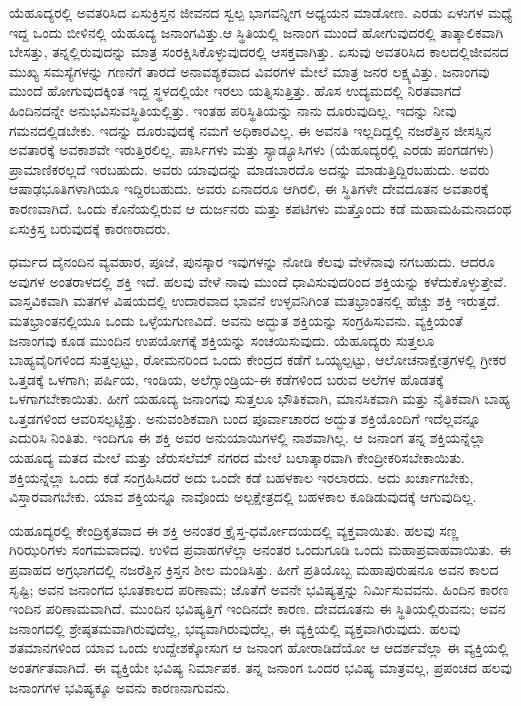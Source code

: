 ಯೆಹೂದ್ಯರಲ್ಲಿ ಅವತರಿಸಿದ ಏಸುಕ್ರಿಸ್ತನ ಜೀವನದ ಸ್ವಲ್ಪ ಭಾಗವನ್ನೀಗ ಅಧ್ಯಯನ ಮಾಡೋಣ. ಎರಡು ಏಳುಗಳ ಮಧ್ಯೆ ಇದ್ದ ಒಂದು ಬೀಳಿನಲ್ಲಿ ಯೆಹೂದ್ಯ ಜನಾಂಗವಿತ್ತು.\break ಆ ಸ್ಥಿತಿಯಲ್ಲಿ ಜನಾಂಗ ಮುಂದೆ ಹೋಗುವುದರಲ್ಲಿ ತಾತ್ಕಾಲಿಕವಾಗಿ ಬೇಸತ್ತು, ತನ್ನಲ್ಲಿರುವುದನ್ನು ಮಾತ್ರ ಸಂರಕ್ಷಿಸಿಕೊಳ್ಳುವುದರಲ್ಲಿ ಆಸಕ್ತವಾಗಿತ್ತು. ಏಸುವು ಅವತರಿಸಿದ ಕಾಲದಲ್ಲಿ\break ಜೀವನದ ಮುಖ್ಯ ಸಮಸ್ಯೆಗಳನ್ನು ಗಣನೆಗೆ ತಾರದೆ ಅನಾವಶ್ಯಕವಾದ ವಿವರಗಳ ಮೇಲೆ ಮಾತ್ರ ಜನರ ಲಕ್ಷ್ಯವಿತ್ತು. ಜನಾಂಗವು ಮುಂದೆ ಹೋಗುವುದಕ್ಕಿಂತ ಇದ್ದ ಸ್ಥಳದಲ್ಲಿಯೇ ಇರಲು ಯತ್ನಿಸುತ್ತಿತ್ತು. ಹೊಸ ಉದ್ಯಮದಲ್ಲಿ ನಿರತವಾಗದೆ ಹಿಂದಿನದನ್ನೇ ಅನುಭವಿಸುವ\break ಸ್ಥಿತಿಯಲ್ಲಿತ್ತು. ಇಂತಹ ಪರಿಸ್ಥಿತಿಯನ್ನು ನಾನು ದೂರುವುದಿಲ್ಲ. ಇದನ್ನು ನೀವು ಗಮನದಲ್ಲಿಡಬೇಕು. ಇದನ್ನು ದೂರುವುದಕ್ಕೆ ನಮಗೆ ಅಧಿಕಾರವಿಲ್ಲ. ಈ ಅವನತಿ ಇಲ್ಲದಿದ್ದಲ್ಲಿ ನಜರೆತ್ತಿನ ಜೀಸಸ್ಸಿನ ಅವತಾರಕ್ಕೆ ಅವಕಾಶವೇ ಇರುತ್ತಿರಲಿಲ್ಲ. ಪಾರ್ಸಿಗಳು ಮತ್ತು ಸ್ಯಾಡ್ಯೂಸಿಗಳು (ಯೆಹೂದ್ಯರಲ್ಲಿ ಎರಡು ಪಂಗಡಗಳು) ಪ್ರಾಮಾಣಿಕರಲ್ಲದೆ ಇರಬಹುದು. ಅವರು ಯಾವುದನ್ನು ಮಾಡಬಾರದೊ ಅದನ್ನು ಮಾಡುತ್ತಿದ್ದಿರಬಹುದು. ಅವರು ಆಷಾಢಭೂತಿಗಳಾಗಿಯೂ ಇದ್ದಿರಬಹುದು. ಅವರು ಏನಾದರೂ ಆಗಿರಲಿ, ಈ ಸ್ಥಿತಿಗಳೇ ದೇವದೂತನ ಅವತಾರಕ್ಕೆ ಕಾರಣವಾಗಿದೆ. ಒಂದು ಕೊನೆಯಲ್ಲಿರುವ ಆ ದುರ್ಜನರು ಮತ್ತು ಕಪಟಿಗಳು ಮತ್ತೊಂದು ಕಡೆ ಮಹಾಮಹಿಮನಾದಂಥ ಏಸುಕ್ರಿಸ್ತ ಬರುವುದಕ್ಕೆ ಕಾರಣರಾದರು.

ಧರ್ಮದ ದೈನಂದಿನ ವ್ಯವಹಾರ, ಪೂಜೆ, ಪುನಸ್ಕಾರ ಇವುಗಳನ್ನು ನೋಡಿ ಕೆಲವು ವೇಳೆ\break ನಾವು ನಗಬಹುದು. ಆದರೂ ಅವುಗಳ ಅಂತರಾಳದಲ್ಲಿ ಶಕ್ತಿ ಇದೆ. ಹಲವು ವೇಳೆ ನಾವು ಮುಂದೆ ಧಾವಿಸುವುದರಿಂದ ಶಕ್ತಿಯನ್ನು ಕಳೆದುಕೊಳ್ಳುತ್ತೇವೆ. ವಾಸ್ತವಿಕವಾಗಿ ಮತಗಳ ವಿಷಯದಲ್ಲಿ ಉದಾರವಾದ ಭಾವನೆ ಉಳ್ಳವನಿಗಿಂತ ಮತಭ್ರಾಂತನಲ್ಲಿ ಹೆಚ್ಚು ಶಕ್ತಿ ಇರುತ್ತದೆ. ಮತಭ್ರಾಂತನಲ್ಲಿಯೂ ಒಂದು ಒಳ್ಳೆಯಗುಣವಿದೆ. ಅವನು ಅದ್ಭುತ ಶಕ್ತಿಯನ್ನು ಸಂಗ್ರಹಿಸುವನು. ವ್ಯಕ್ತಿಯಂತೆ ಜನಾಂಗವು ಕೂಡ ಮುಂದಿನ ಉಪಯೋಗಕ್ಕೆ ಶಕ್ತಿಯನ್ನು ಸಂಚಯಿಸುವುದು. ಯೆಹೂದ್ಯರು ಸುತ್ತಲೂ ಬಾಹ್ಯವೈರಿಗಳಿಂದ ಸುತ್ತಲ್ಪಟ್ಟು, ರೋಮನರಿಂದ ಒಂದು ಕೇಂದ್ರದ ಕಡೆಗೆ ಒಯ್ಯಲ್ಪಟ್ಟು, ಆಲೋಚನಾಕ್ಷೇತ್ರಗಳಲ್ಲಿ ಗ್ರೀಕರ ಒತ್ತಡಕ್ಕೆ ಒಳಗಾಗಿ; ಪರ್ಷಿಯ, ಇಂಡಿಯ, ಅಲೆಗ್ಸಾಂಡ್ರಿಯ-ಈ ಕಡೆಗಳಿಂದ ಬರುವ ಅಲೆಗಳ ಹೊಡತಕ್ಕೆ ಒಳಗಾಗಬೇಕಾಯಿತು. ಹೀಗೆ ಯಹೂದ್ಯ ಜನಾಂಗವು ಸುತ್ತಲೂ ಭೌತಿಕವಾಗಿ, ಮಾನಸಿಕವಾಗಿ ಮತ್ತು ನೈತಿಕವಾಗಿ ಬಾಹ್ಯ ಒತ್ತಡಗಳಿಂದ ಆವರಿಸಲ್ಪಟ್ಟಿತ್ತು. ಅನುವಂಶಿಕವಾಗಿ ಬಂದ ಪೂರ್ವಾಚಾರದ ಅದ್ಭುತ ಶಕ್ತಿಯೊಂದಿಗೆ ಇದೆಲ್ಲವನ್ನೂ ಎದುರಿಸಿ ನಿಂತಿತು. ಇಂದಿಗೂ ಈ ಶಕ್ತಿ ಅವರ ಅನುಯಾಯಿಗಳಲ್ಲಿ ನಾಶವಾಗಿಲ್ಲ. ಆ ಜನಾಂಗ ತನ್ನ ಶಕ್ತಿಯನ್ನೆಲ್ಲಾ ಯಹೂದ್ಯ ಮತದ ಮೇಲೆ ಮತ್ತು ಜೆರುಸಲೆಮ್​ ನಗರದ ಮೇಲೆ ಬಲಾತ್ಕಾರವಾಗಿ ಕೇಂದ್ರೀಕರಿಸಬೇಕಾಯಿತು. ಶಕ್ತಿಯನ್ನೆಲ್ಲಾ ಒಂದು ಕಡೆ ಸಂಗ್ರಹಿಸಿದರೆ ಅದು ಒಂದೇ ಕಡೆ ಬಹಳಕಾಲ ಇರಲಾರದು. ಅದು ಖರ್ಚಾಗಬೇಕು, ವಿಸ್ತಾರವಾಗಬೇಕು. ಯಾವ ಶಕ್ತಿಯನ್ನೂ ನಾವೊಂದು ಅಲ್ಪಕ್ಷೇತ್ರದಲ್ಲಿ ಬಹಳಕಾಲ ಕೂಡಿಡುವುದಕ್ಕೆ ಆಗುವುದಿಲ್ಲ.

ಯಹೂದ್ಯರಲ್ಲಿ ಕೇಂದ್ರಿಕೃತವಾದ ಈ ಶಕ್ತಿ ಅನಂತರ ಕ್ರೈಸ್ತ-ಧರ್ಮೋದಯದಲ್ಲಿ ವ್ಯಕ್ತವಾಯಿತು. ಹಲವು ಸಣ್ಣ ಗಿರಿಝರಿಗಳು ಸಂಗಮವಾದವು. ಉಳಿದ ಪ್ರವಾಹಗಳೆಲ್ಲಾ ಅನಂತರ ಒಂದುಗೂಡಿ ಒಂದು ಮಹಾಪ್ರವಾಹವಾಯಿತು. ಈ ಪ್ರವಾಹದ ಅಗ್ರಭಾಗದಲ್ಲಿ ನಜರೆತ್ತಿನ ಕ್ರಿಸ್ತನ ಶೀಲ ಮಂಡಿಸಿತ್ತು. ಹೀಗೆ ಪ್ರತಿಯೊಬ್ಬ ಮಹಾಪುರುಷನೂ ಅವನ ಕಾಲದ ಸೃಷ್ಟಿ; ಅವನ ಜನಾಂಗದ ಭೂತಕಾಲದ ಪರಿಣಾಮ; ಜೊತೆಗೆ ಅವನೇ ಭವಿಷ್ಯತ್ತನ್ನು ನಿರ್ಮಿಸುವವನು. ಹಿಂದಿನ ಕಾರಣ ಇಂದಿನ ಪರಿಣಾಮವಾಗಿದೆ. ಮುಂದಿನ ಭವಿಷ್ಯತ್ತಿಗೆ ಇಂದಿನದೇ ಕಾರಣ. ದೇವದೂತನು ಈ ಸ್ಥಿತಿಯಲ್ಲಿರುವನು; ಅವನ ಜನಾಂಗದಲ್ಲಿ ಶ್ರೇಷ್ಠತಮವಾಗಿರುವುದೆಲ್ಲ, ಭವ್ಯವಾಗಿರುವುದೆಲ್ಲ, ಈ ವ್ಯಕ್ತಿಯಲ್ಲಿ ವ್ಯಕ್ತವಾಗಿರುವುದು. ಹಲವು ಶತಮಾನಗಳಿಂದ ಯಾವ ಒಂದು ಉದ್ದೇಶಕ್ಕೋಸುಗ ಆ ಜನಾಂಗ ಹೋರಾಡಿದೆಯೋ ಆ ಆದರ್ಶವೆಲ್ಲಾ ಈ ವ್ಯಕ್ತಿಯಲ್ಲಿ ಅಂತರ್ಗತವಾಗಿದೆ. ಈ ವ್ಯಕ್ತಿಯೇ ಭವಿಷ್ಯ ನಿರ್ಮಾಪಕ. ತನ್ನ ಜನಾಂಗ ಒಂದರ ಭವಿಷ್ಯ ಮಾತ್ರವಲ್ಲ, ಪ್ರಪಂಚದ ಹಲವು ಜನಾಂಗಗಳ ಭವಿಷ್ಯಕ್ಕೂ ಅವನು ಕಾರಣನಾಗುವನು.

